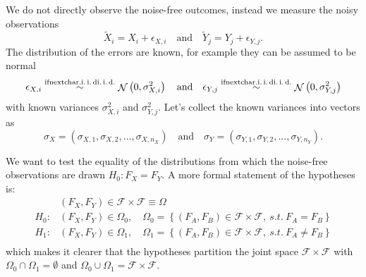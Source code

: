 \documentclass[12pt]{article}
\makeatletter
\newcommand*{\iid}{%
    \@ifnextchar{.}%
        {i.\,i.\,d}%
        {i.\,i.\,d.\@}%
}
\newcommand{\mathiid}{\text{\iid}}
\newcommand{\simiid}{\overset{\mathiid}{\sim}}
\newcommand{\genericdel}[3]{%
  \left#1{#3}\right#2
}
\newcommand{\del}[1]{\genericdel(){#1}}
\newcommand{\cbr}[1]{\genericdel\{\}{#1}}
\DeclareMathOperator{\normal}{\mathcal{N}}
\newcommand{\alldistribs}{\mathcal{F}}
\newcommand{\Xtilde}{\tilde{X}}
\newcommand{\Ytilde}{\tilde{Y}}
\makeatother
\begin{document}
We do not directly observe the noise-free outcomes, instead we measure the noisy observations 
\begin{equation}
    \Xtilde_i = X_i + \epsilon_{X,i}
    \quad\text{and}\quad
    \Ytilde_j = Y_j + \epsilon_{Y,j}.
    \label{eq:xytilde}
\end{equation}
The distribution of the errors are known, for example they can be assumed to be normal
\begin{equation}
    \epsilon_{X,i} \simiid \normal\del{0, \sigma^2_{X,i}}
    \quad\text{and}\quad
    \epsilon_{Y,j} \simiid \normal\del{0, \sigma^2_{Y,j}}
\end{equation}
with known variances $\sigma^2_{X,i}$ and $\sigma^2_{Y,j}$. Let's collect the known variances into vectors as
$$\sigma_X = (\sigma_{X,1}, \sigma_{X,2}, ..., \sigma_{X,n_X})
    \quad\text{and}\quad
\sigma_Y = (\sigma_{Y,1}, \sigma_{Y,2}, ..., \sigma_{Y,n_Y}).$$

We want to test the equality of the distributions from which the noise-free observations are drawn $H_0: F_X = F_Y$. 
A more formal statement of the hypotheses is:
\begin{equation}
\begin{split}
    & (F_X, F_Y) \in \alldistribs \times \alldistribs \equiv \Omega \\
    H_0:& (F_X, F_Y) \in \Omega_0,\quad \Omega_0 = \cbr{(F_A, F_B) \in \alldistribs \times \alldistribs,\ s.t.\ F_A =    F_B } \\
    H_1:& (F_X, F_Y) \in \Omega_1,\quad \Omega_1 = \cbr{(F_A, F_B) \in \alldistribs \times \alldistribs,\ s.t.\ F_A \neq F_B } \\
\end{split}
\end{equation}
which makes it clearer that the hypotheses partition the joint space $\alldistribs \times \alldistribs$
with $\Omega_0 \cap \Omega_1 = \emptyset$ and $\Omega_0 \cup \Omega_1 = \alldistribs \times \alldistribs$.
\end{document}
